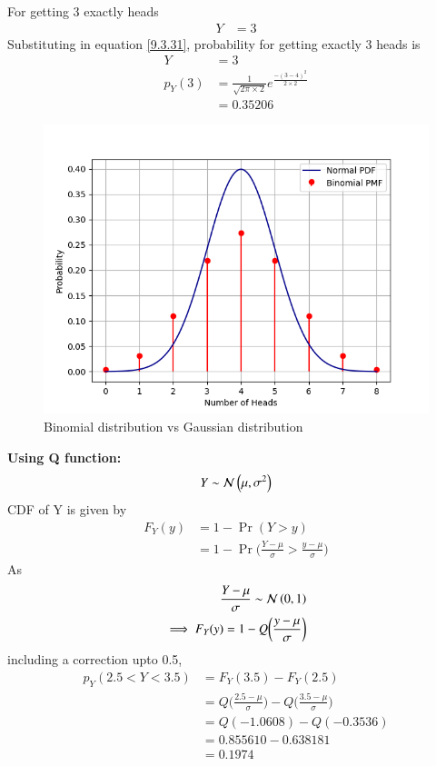 \documentclass[journal,12pt,twocolumn]{IEEEtran}
\theoremstyle{remark}
\begin{document}
For getting 3 exactly heads
\begin{align}
	Y &= 3
\end{align}
Substituting in equation \eqref{9.3.31}, probability for getting exactly 3 heads is
\begin{align}
	Y &= 3\\
	p_Y(3) &= \frac{1}{\sqrt{2\pi\times2}}e^{\frac{-(3-4)^2}{2\times2}}\\
	&= 0.35206
\end{align}
\begin{figure}[H]
\includegraphics[width=\columnwidth]{./figs/fig.png}
\caption{Binomial distribution vs Gaussian distribution}
	\label{fig58:_9_3_31}
\end{figure}
\textbf{Using Q function:}
\begin{align}
	Y \sim \mathcal{N}\left(\mu,\sigma^2\right)
\end{align}
CDF of Y is given by
\begin{align}
	F_Y(y) &= 1 - \Pr(Y>y)\\
	&= 1 - \Pr\biggl(\frac{Y-\mu}{\sigma}>\frac{y-\mu}{\sigma}\biggr)
\end{align}
As
\begin{align}
	\frac{Y-\mu}{\sigma} \sim \mathcal{N}\left(0,1\right)\\
	\implies F_Y(y) = 1 - Q\biggl(\frac{y-\mu}{\sigma}\biggr)
\end{align}
including a correction upto 0.5,
\begin{align}
	p_Y(2.5<Y<3.5) & = F_Y(3.5) - F_Y(2.5)\\
	&= Q\biggl( \frac{2.5-\mu}{\sigma} \biggr) - Q\biggl( \frac{3.5-\mu}{\sigma} \biggr)\\
	&= Q(-1.0608) - Q(-0.3536)\\
	&= 0.855610 - 0.638181\\
	&= 0.1974
\end{align}
\end{document}
